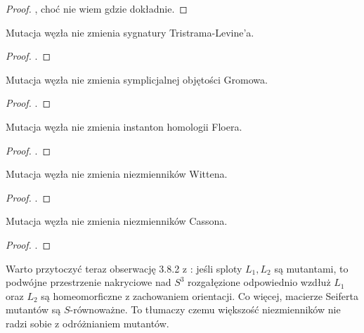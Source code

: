 \begin{proof}
    \cite{tanaka09}, choć nie wiem gdzie dokładnie.
\end{proof}

\begin{proposition}
    Mutacja węzła nie zmienia sygnatury Tristrama-Levine'a.
\end{proposition}

\begin{proof}
    \cite{cooper99}.
\end{proof}

\begin{proposition}
    \label{mutants_the_same_volume}
    Mutacja węzła nie zmienia symplicjalnej objętości Gromowa.
\end{proposition}

\begin{proof}
    \cite{ruberman87}.
\end{proof}

\begin{proposition}
    Mutacja węzła nie zmienia instanton homologii Floera.
\end{proposition}

\begin{proof}
    \cite{ruberman99}.
\end{proof}

\begin{proposition}
    Mutacja węzła nie zmienia niezmienników Wittena.
\end{proposition}

\begin{proof}
    \cite{rong94}.
\end{proof}

\begin{proposition}
    Mutacja węzła nie zmienia niezmienników Cassona.
\end{proposition}

\begin{proof}
    \cite{kirk89}.
\end{proof}

Warto przytoczyć teraz obserwację 3.8.2 z \cite[s. 43]{kawauchi96}: jeśli sploty $L_1, L_2$ są mutantami, to podwójne przestrzenie nakryciowe nad $S^3$ rozgałęzione odpowiednio wzdłuż $L_1$ oraz $L_2$ są homeomorficzne z zachowaniem orientacji.
Co więcej, macierze Seiferta mutantów są $S$-równoważne.
To tłumaczy czemu większość niezmienników nie radzi sobie z odróżnianiem mutantów.

